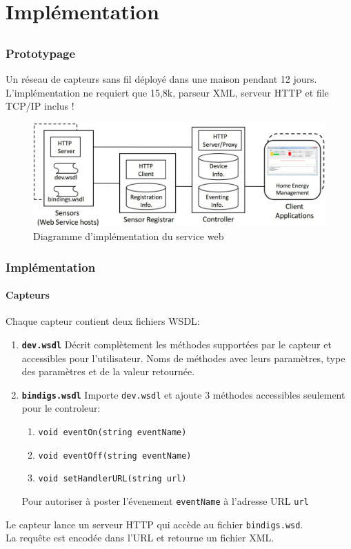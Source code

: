 \section{Implémentation}
\subsection{}
\begin{frame}
 \frametitle{Prototypage}
 Un réseau de capteurs sans fil déployé dans une maison pendant 12 jours.
 L'implémentation ne requiert \alert{que 15,8k}, parseur XML, serveur HTTP et file TCP/IP inclus !
 \begin{figure}
  \centering
  \includegraphics[scale=0.36]{figures/implementation.jpg}
  \caption{Diagramme d'implémentation du service web}
 \end{figure} 
\end{frame}

\begin{frame}
 \frametitle{Implémentation}
 \framesubtitle{Capteurs}
 Chaque capteur contient deux fichiers WSDL:
 \begin{enumerate}
  \item \textbf{\texttt{dev.wsdl}} Décrit complètement les méthodes supportées par le capteur et accessibles pour l'utilisateur. Noms de méthodes avec leurs paramètres, type des paramètres et de la valeur retournée.
  \item \textbf{\texttt{bindigs.wsdl}} Importe \texttt{dev.wsdl} et ajoute 3 méthodes accessibles seulement pour le controleur:
   \begin{enumerate}
    \item \texttt{void eventOn(string eventName)}
    \item \texttt{void eventOff(string eventName)}
    \item \texttt{void setHandlerURL(string url)}
   \end{enumerate}
   Pour autoriser à poster l'évenement \texttt{eventName} à l'adresse URL \texttt{url}
 \end{enumerate}
 Le capteur lance un serveur HTTP qui accède au fichier \texttt{bindigs.wsd}.\\
 La requête est encodée dans l'URL et retourne un fichier XML.
\end{frame}

